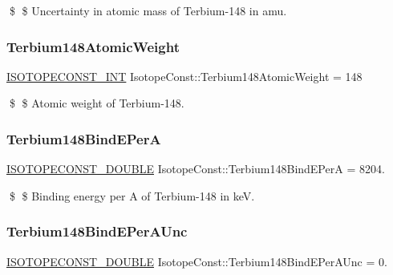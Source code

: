 \$ \$ Uncertainty in atomic mass of Terbium-\/148 in amu. \mbox{\label{group___isotope_const-_terbium-_tb148_gac04096b0fa9e617bca6c0cac1af536af}} 
\subsubsection{\texorpdfstring{Terbium148\+Atomic\+Weight}{Terbium148AtomicWeight}}
{\footnotesize\ttfamily \mbox{\hyperlink{group___isotope_const-_macros_ga5f18360b3e99483a35c32d789e62621c}{I\+S\+O\+T\+O\+P\+E\+C\+O\+N\+S\+T\+\_\+\+I\+NT}} Isotope\+Const\+::\+Terbium148\+Atomic\+Weight = 148}

\$ \$ Atomic weight of Terbium-\/148. \mbox{\label{group___isotope_const-_terbium-_tb148_ga8a725113dd3a259ad090ca70ec796198}} 
\subsubsection{\texorpdfstring{Terbium148\+Bind\+E\+PerA}{Terbium148BindEPerA}}
{\footnotesize\ttfamily \mbox{\hyperlink{group___isotope_const-_macros_ga8f45a7272ce02c0b4c65c44636ed719a}{I\+S\+O\+T\+O\+P\+E\+C\+O\+N\+S\+T\+\_\+\+D\+O\+U\+B\+LE}} Isotope\+Const\+::\+Terbium148\+Bind\+E\+PerA = 8204.}

\$ \$ Binding energy per A of Terbium-\/148 in keV. \mbox{\label{group___isotope_const-_terbium-_tb148_ga10980f8e6223de894fa0e5e7a3cdbbfa}} 
\subsubsection{\texorpdfstring{Terbium148\+Bind\+E\+Per\+A\+Unc}{Terbium148BindEPerAUnc}}
{\footnotesize\ttfamily \mbox{\hyperlink{group___isotope_const-_macros_ga8f45a7272ce02c0b4c65c44636ed719a}{I\+S\+O\+T\+O\+P\+E\+C\+O\+N\+S\+T\+\_\+\+D\+O\+U\+B\+LE}} Isotope\+Const\+::\+Terbium148\+Bind\+E\+Per\+A\+Unc = 0.}


